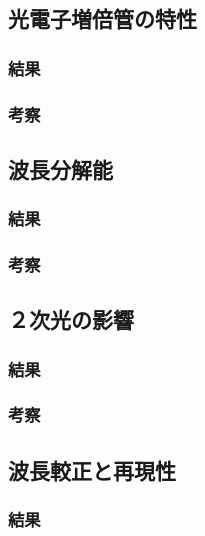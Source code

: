 \documentclass[uplatex,dvipdfmx,a4j,12pt]{jsarticle}
\begin{document}
\subsection{光電子増倍管の特性}

\subsubsection{結果}

\subsubsection{考察}

\subsection{波長分解能}

\subsubsection{結果}

\subsubsection{考察}

\subsection{２次光の影響}

\subsubsection{結果}

\subsubsection{考察}

\subsection{波長較正と再現性}

\subsubsection{結果}
\end{document}

